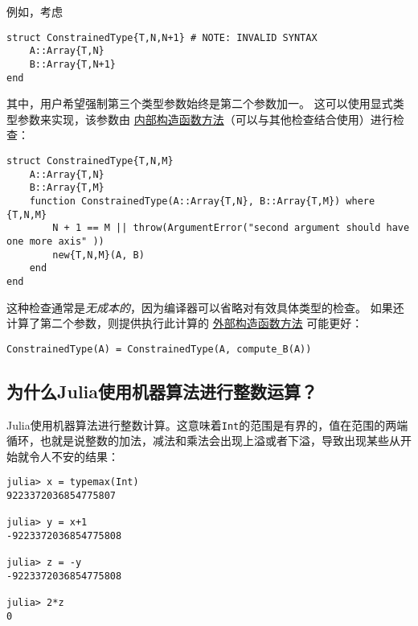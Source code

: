 例如，考虑




\begin{verbatim}
struct ConstrainedType{T,N,N+1} # NOTE: INVALID SYNTAX
    A::Array{T,N}
    B::Array{T,N+1}
end
\end{verbatim}



其中，用户希望强制第三个类型参数始终是第二个参数加一。 这可以使用显式类型参数来实现，该参数由 \hyperlink{5052047505447273614}{内部构造函数方法}（可以与其他检查结合使用）进行检查：




\begin{verbatim}
struct ConstrainedType{T,N,M}
    A::Array{T,N}
    B::Array{T,M}
    function ConstrainedType(A::Array{T,N}, B::Array{T,M}) where {T,N,M}
        N + 1 == M || throw(ArgumentError("second argument should have one more axis" ))
        new{T,N,M}(A, B)
    end
end
\end{verbatim}



这种检查通常是\emph{无成本的}，因为编译器可以省略对有效具体类型的检查。 如果还计算了第二个参数，则提供执行此计算的 \hyperlink{1408947822788665444}{外部构造函数方法} 可能更好：




\begin{verbatim}
ConstrainedType(A) = ConstrainedType(A, compute_B(A))
\end{verbatim}



\hypertarget{3408319939041447292}{}


\subsection{为什么Julia使用机器算法进行整数运算？}



Julia使用机器算法进行整数计算。这意味着\texttt{Int}的范围是有界的，值在范围的两端循环，也就是说整数的加法，减法和乘法会出现上溢或者下溢，导致出现某些从开始就令人不安的结果：




\begin{verbatim}
julia> x = typemax(Int)
9223372036854775807

julia> y = x+1
-9223372036854775808

julia> z = -y
-9223372036854775808

julia> 2*z
0
\end{verbatim}



